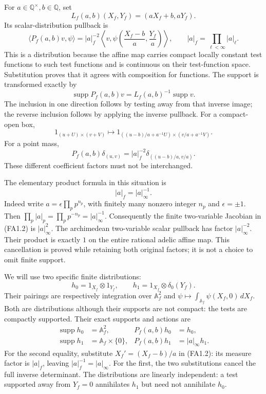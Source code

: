 For \(a\in\mathbb Q^\times,b\in\mathbb Q\), set \[
 L_f(a,b)(X_f,Y_f)=(aX_f+b,aY_f).
\] Its scalar-distribution pullback is \[
 \langle P_f(a,b)v,\psi\rangle
  =|a|_f^{-2}
       \left\langle v,
         \psi\!\left(\frac{X_f-b}{a},\frac{Y_f}{a}\right)
       \right\rangle,\qquad
 |a|_f=\prod_{\ell<\infty}|a|_\ell.
\tag{FA1.2}
\] This is a distribution because the affine map carries compact locally
constant test functions to such test functions and is continuous on
their test-function space. Substitution proves that it agrees with
composition for functions. The support is transformed exactly by \[
 \operatorname{supp}P_f(a,b)v
     =L_f(a,b)^{-1}\operatorname{supp}v.
\tag{FA1.3}
\] The inclusion in one direction follows by testing away from that
inverse image; the reverse inclusion follows by applying the inverse
pullback. For a compact-open box, \[
 1_{(u+U)\times(v+V)}
 \longmapsto
 1_{((u-b)/a+a^{-1}U)\times(v/a+a^{-1}V)}.
\tag{FA1.4}
\] For a point mass, \[
 P_f(a,b)\delta_{(u,v)}
    =|a|_f^{-2}\delta_{((u-b)/a,v/a)}.
\tag{FA1.5}
\] These different coefficient factors must not be interchanged.

The elementary product formula in this situation is \[
 |a|_f=|a|_\infty^{-1}.
\tag{FA1.6}
\] Indeed write \(a=\epsilon\prod_p p^{n_p}\), with finitely many
nonzero integer \(n_p\) and \(\epsilon=\pm1\). Then
\(\prod_p|a|_p=\prod_p p^{-n_p}=|a|_\infty^{-1}\). Consequently the
finite two-variable Jacobian in (FA1.2) is \(|a|_\infty^2\). The
archimedean two-variable scalar pullback has factor \(|a|_\infty^{-2}\).
Their product is exactly \(1\) on the entire rational adelic affine map.
This cancellation is proved while retaining both original factors; it is
not a choice to omit finite support.

We will use two specific finite distributions: \[
 h_0=1_{X_f}\otimes1_{Y_f},\qquad
 h_1=1_{X_f}\otimes\delta_0(Y_f).
\tag{FA1.7}
\] Their pairings are respectively integration over \(\mathbb A_f^2\)
and \(\psi\mapsto\int_{\mathbb A_f}\psi(X_f,0)\,dX_f\). Both are
distributions although their supports are not compact: the tests are
compactly supported. Their exact supports and actions are \[
 \begin{aligned}
 \operatorname{supp}h_0&=\mathbb A_f^2,&
 P_f(a,b)h_0&=h_0,\\
 \operatorname{supp}h_1&=\mathbb A_f\times\{0\},&
 P_f(a,b)h_1&=|a|_\infty h_1.
 \end{aligned}
\tag{FA1.8}
\] For the second equality, substitute \(X_f'=(X_f-b)/a\) in (FA1.2):
its measure factor is \(|a|_f\), leaving \(|a|_f^{-1}=|a|_\infty\). For
the first, the two substitutions cancel the full inverse determinant.
The distributions are linearly independent: a test supported away from
\(Y_f=0\) annihilates \(h_1\) but need not annihilate \(h_0\).

